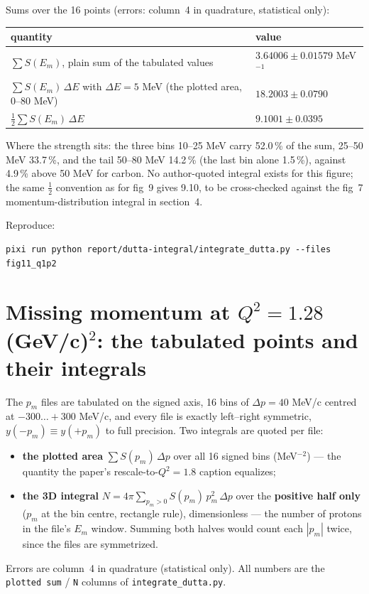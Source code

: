 \documentclass[11pt]{article}
\begin{document}
Sums over the 16 points (errors: column~4 in quadrature, statistical only):

\begin{center}
\begin{tabular}{ll}
\toprule
quantity & value \\
\midrule
$\sum S(E_m)$, plain sum of the tabulated values & $\mathbf{3.64006 \pm 0.01579}$ MeV$^{-1}$ \\
$\sum S(E_m)\,\Delta E$ with $\Delta E = 5$ MeV (the plotted area, 0--80 MeV) & $\mathbf{18.2003 \pm 0.0790}$ \\
$\tfrac12 \sum S(E_m)\,\Delta E$ & $9.1001 \pm 0.0395$ \\
\bottomrule
\end{tabular}
\end{center}

Where the strength sits: the three bins 10--25 MeV carry 52.0\,\% of the sum,
25--50 MeV 33.7\,\%, and the tail 50--80 MeV 14.2\,\% (the last bin alone
1.5\,\%), against 4.9\,\% above 50 MeV for carbon. No author-quoted integral
exists for this figure; the same $\tfrac12$ convention as for fig~9 gives
9.10, to be cross-checked against the fig~7 momentum-distribution integral in
section~4.

Reproduce:
\begin{verbatim}
pixi run python report/dutta-integral/integrate_dutta.py --files fig11_q1p2
\end{verbatim}

\section{Missing momentum at \texorpdfstring{$Q^2 = 1.28$ (GeV/c)$^2$}{Q2 = 1.28 (GeV/c)2}: the tabulated points and their integrals}

The $p_m$ files are tabulated on the signed axis, 16 bins of
$\Delta p = 40$ MeV/c centred at $-300 \ldots +300$ MeV/c, and every file is
exactly left--right symmetric, $y(-p_m) \equiv y(+p_m)$ to full precision.
Two integrals are quoted per file:
\begin{itemize}
\item \textbf{the plotted area} $\sum S(p_m)\,\Delta p$ over all 16 signed
  bins (MeV$^{-2}$) --- the quantity the paper's rescale-to-$Q^2 = 1.8$
  caption equalizes;
\item \textbf{the 3D integral} $N = 4\pi \sum_{p_m > 0} S(p_m)\,p_m^2\,\Delta p$
  over the \textbf{positive half only} ($p_m$ at the bin centre, rectangle
  rule), dimensionless --- the number of protons in the file's $E_m$ window.
  Summing both halves would count each $|p_m|$ twice, since the files are
  symmetrized.
\end{itemize}
Errors are column~4 in quadrature (statistical only). All numbers are the
\texttt{plotted sum} / \texttt{N} columns of \texttt{integrate\_dutta.py}.
\end{document}
